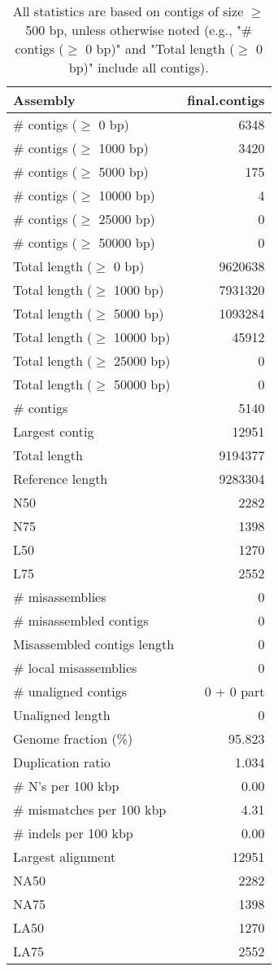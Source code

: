 \documentclass[12pt,a4paper]{article}
\begin{document}
\begin{table}[ht]
\begin{center}
\caption{All statistics are based on contigs of size $\geq$ 500 bp, unless otherwise noted (e.g., "\# contigs ($\geq$ 0 bp)" and "Total length ($\geq$ 0 bp)" include all contigs).}
\begin{tabular}{|l*{1}{|r}|}
\hline
Assembly & final.contigs \\ \hline
\# contigs ($\geq$ 0 bp) & 6348 \\ \hline
\# contigs ($\geq$ 1000 bp) & 3420 \\ \hline
\# contigs ($\geq$ 5000 bp) & 175 \\ \hline
\# contigs ($\geq$ 10000 bp) & 4 \\ \hline
\# contigs ($\geq$ 25000 bp) & 0 \\ \hline
\# contigs ($\geq$ 50000 bp) & 0 \\ \hline
Total length ($\geq$ 0 bp) & 9620638 \\ \hline
Total length ($\geq$ 1000 bp) & 7931320 \\ \hline
Total length ($\geq$ 5000 bp) & 1093284 \\ \hline
Total length ($\geq$ 10000 bp) & 45912 \\ \hline
Total length ($\geq$ 25000 bp) & 0 \\ \hline
Total length ($\geq$ 50000 bp) & 0 \\ \hline
\# contigs & 5140 \\ \hline
Largest contig & 12951 \\ \hline
Total length & 9194377 \\ \hline
Reference length & 9283304 \\ \hline
N50 & 2282 \\ \hline
N75 & 1398 \\ \hline
L50 & 1270 \\ \hline
L75 & 2552 \\ \hline
\# misassemblies & 0 \\ \hline
\# misassembled contigs & 0 \\ \hline
Misassembled contigs length & 0 \\ \hline
\# local misassemblies & 0 \\ \hline
\# unaligned contigs & 0 + 0 part \\ \hline
Unaligned length & 0 \\ \hline
Genome fraction (\%) & 95.823 \\ \hline
Duplication ratio & 1.034 \\ \hline
\# N's per 100 kbp & 0.00 \\ \hline
\# mismatches per 100 kbp & 4.31 \\ \hline
\# indels per 100 kbp & 0.00 \\ \hline
Largest alignment & 12951 \\ \hline
NA50 & 2282 \\ \hline
NA75 & 1398 \\ \hline
LA50 & 1270 \\ \hline
LA75 & 2552 \\ \hline
\end{tabular}
\end{center}
\end{table}
\end{document}
